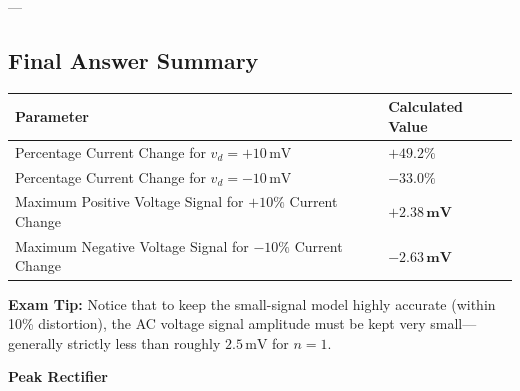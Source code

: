 \documentclass[12pt,a3paper]{article}
\newcommand{\subtopic}[2]{%
  \vspace{10pt}
  \noindent\begin{tcolorbox}[colback=#1!8,colframe=#1,boxrule=0.6pt,arc=4pt,
    left=6pt,right=6pt,top=4pt,bottom=4pt]
    \small\bfseries\textcolor{#1}{#2}
  \end{tcolorbox}
  \vspace{2pt}
}
\begin{document}
\begin{enumerate}
\begin{tcolorbox}[enhanced,breakable,ansbox,colback=cA!4,colframe=cA,boxrule=0.8pt,arc=5pt,title={\textbf{Answer}},fonttitle=\bfseries\color{white},colbacktitle=cA]
---

\subsection*{Final Answer Summary}

\begin{center}
\renewcommand{\arraystretch}{1.5}
\begin{tabular}{@{}ll@{}}
\toprule
\textbf{Parameter} & \textbf{Calculated Value} \\ \midrule
Percentage Current Change for $v_d = +10\,\text{mV}$ & $\mathbf{+49.2\%}$ \\
Percentage Current Change for $v_d = -10\,\text{mV}$ & $\mathbf{-33.0\%}$ \\
Maximum Positive Voltage Signal for $+10\%$ Current Change & $\mathbf{+2.38\,\text{mV}}$ \\
Maximum Negative Voltage Signal for $-10\%$ Current Change & $\mathbf{-2.63\,\text{mV}}$ \\ \bottomrule
\end{tabular}
\end{center}

\textbf{Exam Tip:} Notice that to keep the small-signal model highly accurate (within 10\% distortion), the AC voltage signal amplitude must be kept very small—generally strictly less than roughly $2.5\,\text{mV}$ for $n=1$.

\end{tcolorbox}

\end{enumerate}

\subtopic{cA}{Peak Rectifier}
\label{sub:s1-peak}
\end{document}
